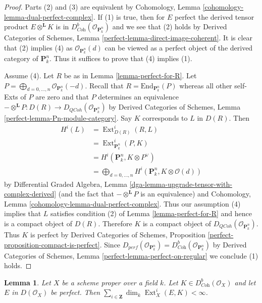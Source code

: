 \documentclass{stacks-project}
\theoremstyle{plain}
\newtheorem{lemma}[subsection]{Lemma}
\theoremstyle{definition}
\theoremstyle{remark}
\numberwithin{equation}{subsection}
\def\Ext{\mathop{\mathrm{Ext}}\nolimits}
\def\QCoh{\mathit{QCoh}}
\begin{document}
\begin{proof}
Parts (2) and (3) are equivalent by
Cohomology, Lemma \ref{cohomology-lemma-dual-perfect-complex}.
If (1) is true, then for $E$ perfect the derived tensor product
$E \otimes^\mathbf{L} K$ is in
$D^b_{\textit{Coh}}(\mathcal{O}_{\mathbf{P}^n_k})$
and we see that (2) holds by 
Derived Categories of Schemes, Lemma \ref{perfect-lemma-direct-image-coherent}.
It is clear that (2) implies (4) as $\mathcal{O}_{\mathbf{P}^n_k}(d)$
can be viewed
as a perfect object of the derived category of $\mathbf{P}^n_k$.
Thus it suffices to prove that (4) implies (1).

\medskip\noindent
Assume (4). Let $R$ be as in Lemma \ref{lemma-perfect-for-R}.
Let $P = \bigoplus_{d = 0, \ldots, n} \mathcal{O}_{\mathbf{P}^n_k}(-d)$.
Recall that $R = \text{End}_{\mathbf{P}^n_k}(P)$ whereas all other
self-Exts of $P$ are zero and that $P$ determines an equivalence
$- \otimes^\mathbf{L} P : D(R) \to D_\QCoh(\mathcal{O}_{\mathbf{P}^n_k})$
by Derived Categories of Schemes, Lemma \ref{perfect-lemma-Pn-module-category}.
Say $K$ corresponds to $L$ in $D(R)$. Then
\begin{align*}
H^i(L)
& =
\Ext^i_{D(R)}(R, L) \\
& =
\Ext^i_{\mathbf{P}^n_k}(P, K) \\
& =
H^i(\mathbf{P}^n_k, K \otimes P^\vee) \\
& =
\bigoplus\nolimits_{d = 0, \ldots, n}
H^i(\mathbf{P}^n_k, K \otimes \mathcal{O}(d))
\end{align*}
by Differential Graded Algebra, Lemma
\ref{dga-lemma-upgrade-tensor-with-complex-derived}
(and the fact that $- \otimes^\mathbf{L} P$ is an equivalence)
and Cohomology, Lemma \ref{cohomology-lemma-dual-perfect-complex}.
Thus our assumption (4) implies that $L$ satisfies condition (2) of
Lemma \ref{lemma-perfect-for-R} and hence is a compact object of $D(R)$.
Therefore $K$ is a compact object of
$D_\QCoh(\mathcal{O}_{\mathbf{P}^n_k})$.
Thus $K$ is perfect by
Derived Categories of Schemes, Proposition
\ref{perfect-proposition-compact-is-perfect}.
Since $D_{perf}(\mathcal{O}_{\mathbf{P}^n_k}) =
D^b_{\textit{Coh}}(\mathcal{O}_{\mathbf{P}^n_k})$
by
Derived Categories of Schemes, Lemma \ref{perfect-lemma-perfect-on-regular}
we conclude (1) holds.
\end{proof}

\begin{lemma}
\label{lemma-finiteness}
Let $X$ be a scheme proper over a field $k$. Let
$K \in D^b_{\textit{Coh}}(\mathcal{O}_X)$ and let $E$ in $D(\mathcal{O}_X)$
be perfect. Then
$\sum_{i \in \mathbf{Z}} \dim_k \Ext^i_X(E, K) < \infty$.
\end{lemma}
\end{document}
